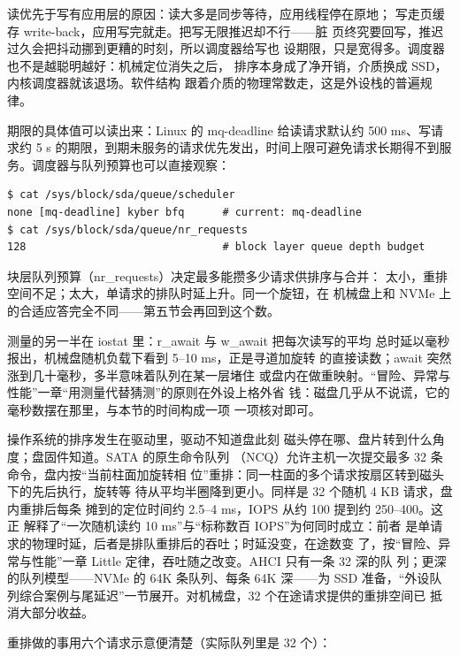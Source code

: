 读优先于写有应用层的原因：读大多是同步等待，应用线程停在原地；
写走页缓存 write-back，应用写完就走。把写无限推迟却不行——脏
页终究要回写，推迟过久会把抖动挪到更糟的时刻，所以调度器给写也
设期限，只是宽得多。调度器也不是越聪明越好：机械定位消失之后，
排序本身成了净开销，介质换成 SSD，内核调度器就该退场。软件结构
跟着介质的物理常数走，这是外设栈的普遍规律。

期限的具体值可以读出来：Linux 的 mq-deadline 给读请求默认约
500 ms、写请求约 5 s 的期限，到期未服务的请求优先发出，时间上限可避免请求长期得不到服务。调度器与队列预算也可以直接观察：

\begin{lstlisting}
$ cat /sys/block/sda/queue/scheduler
none [mq-deadline] kyber bfq      # current: mq-deadline
$ cat /sys/block/sda/queue/nr_requests
128                               # block layer queue depth budget
\end{lstlisting}

块层队列预算（nr\_requests）决定最多能攒多少请求供排序与合并：
太小，重排空间不足；太大，单请求的排队时延上升。同一个旋钮，在
机械盘上和 NVMe 上的合适应答完全不同——第五节会再回到这个数。

测量的另一半在 iostat 里：r\_await 与 w\_await 把每次读写的平均
总时延以毫秒报出，机械盘随机负载下看到 5--10 ms，正是寻道加旋转
的直接读数；await 突然涨到几十毫秒，多半意味着队列在某一层堵住
或盘内在做重映射。“冒险、异常与性能”一章“用测量代替猜测”的原则在外设上格外省
钱：磁盘几乎从不说谎，它的毫秒数摆在那里，与本节的时间构成一项
一项核对即可。

操作系统的排序发生在驱动里，驱动不知道盘此刻
磁头停在哪、盘片转到什么角度；盘固件知道。SATA 的原生命令队列
（NCQ）允许主机一次提交最多 32 条命令，盘内按“当前柱面加旋转相
位”重排：同一柱面的多个请求按扇区转到磁头下的先后执行，旋转等
待从平均半圈降到更小。同样是 32 个随机 4 KB 请求，盘内重排后每条
摊到的定位时间约 2.5--4 ms，IOPS 从约 100 提到约 250--400。这正
解释了“一次随机读约 10 ms”与“标称数百 IOPS”为何同时成立：前者
是单请求的物理时延，后者是排队重排后的吞吐；时延没变，在途数变
了，按“冒险、异常与性能”一章 Little 定律，吞吐随之改变。AHCI 只有一条 32 深的队
列；更深的队列模型——NVMe 的 64K 条队列、每条 64K 深——为 SSD
准备，“外设队列综合案例与尾延迟”一节展开。对机械盘，32 个在途请求提供的重排空间已
抵消大部分收益。

重排做的事用六个请求示意便清楚（实际队列里是 32 个）：

